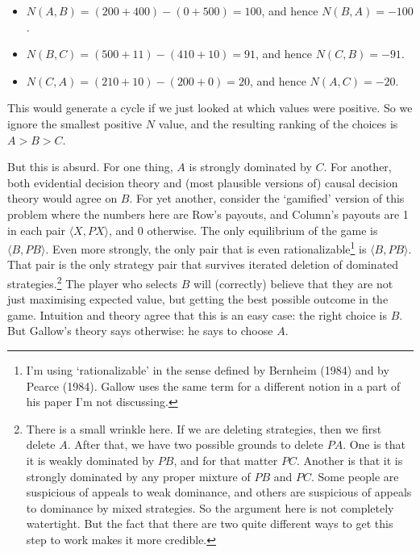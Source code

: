 \documentclass[
  12pt,
]{article}
\providecommand{\tightlist}{%
  \setlength{\itemsep}{0pt}\setlength{\parskip}{0pt}}
\begin{document}
\begin{itemize}
\tightlist
\item
  \(N(A, B) = (200 + 400) - (0 + 500) = 100\), and hence
  \(N(B, A) = -100\).
\item
  \(N(B, C) = (500 + 11) - (410 + 10) = 91\), and hence
  \(N(C, B) = -91\).
\item
  \(N(C, A) = (210 + 10) - (200 + 0) = 20\), and hence
  \(N(A, C) = -20\).
\end{itemize}

This would generate a cycle if we just looked at which values were
positive. So we ignore the smallest positive \(N\) value, and the
resulting ranking of the choices is \(A > B > C\).

But this is absurd. For one thing, \(A\) is strongly dominated by \(C\).
For another, both evidential decision theory and (most plausible
versions of) causal decision theory would agree on \(B\). For yet
another, consider the `gamified' version of this problem where the
numbers here are Row's payouts, and Column's payouts are 1 in each pair
\(\langle X, PX\rangle\), and 0 otherwise. The only equilibrium of the
game is \(\langle B, PB\rangle\). Even more strongly, the only pair that
is even rationalizable\footnote{I'm using `rationalizable' in the sense
  defined by Bernheim (1984) and by Pearce (1984). Gallow uses the same
  term for a different notion in a part of his paper I'm not discussing.}
is \(\langle B, PB\rangle\). That pair is the only strategy pair that
survives iterated deletion of dominated strategies.\footnote{There is a
  small wrinkle here. If we are deleting strategies, then we first
  delete \(A\). After that, we have two possible grounds to delete
  \(PA\). One is that it is weakly dominated by \(PB\), and for that
  matter \(PC\). Another is that it is strongly dominated by any proper
  mixture of \(PB\) and \(PC\). Some people are suspicious of appeals to
  weak dominance, and others are suspicious of appeals to dominance by
  mixed strategies. So the argument here is not completely watertight.
  But the fact that there are two quite different ways to get this step
  to work makes it more credible.} The player who selects \(B\) will
(correctly) believe that they are not just maximising expected value,
but getting the best possible outcome in the game. Intuition and theory
agree that this is an easy case: the right choice is \(B\). But Gallow's
theory says otherwise: he says to choose \(A\).
\end{document}
